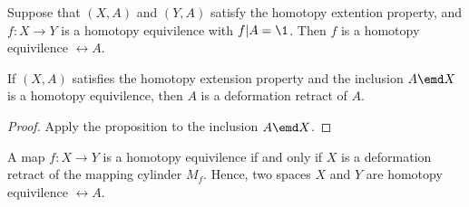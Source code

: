 \begin{nprop}
  Suppose that $(X, A)$ and $(Y, A)$ satisfy the homotopy extention property, and $f : X \to Y$ is a homotopy equivilence with $f | A = \1$. Then $f$ is a homotopy equivilence $\rel A$.
\end{nprop}

\begin{ncor}
 If $(X, A)$ satisfies the homotopy extension property and the inclusion $A \emd X$ is a homotopy equivilence, then $A$ is a deformation retract of $A$.
\end{ncor}

\begin{proof}
  Apply the proposition to the inclusion $A \emd X$.
\end{proof}

\begin{ncor}
 A map $f : X \to Y$ is a homotopy equivilence if and only if $X$ is a deformation retract of the mapping cylinder $M_f$. Hence, two spaces $X$ and $Y$ are homotopy equivilence $\rel A$. 
\end{ncor}
